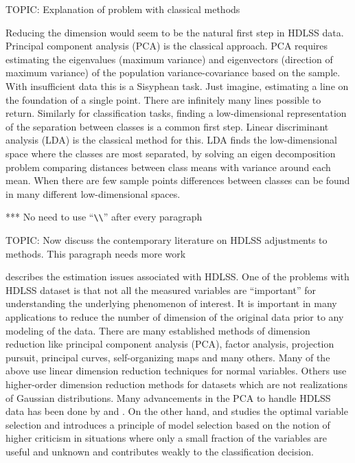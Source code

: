 \documentclass[12]{article}
\newcommand{\blue}{\color{blue}}
\begin{document}
{\blue TOPIC: Explanation of problem with classical methods}

Reducing the dimension would seem to be the natural first step in HDLSS data. Principal component analysis (PCA) is the classical approach. PCA requires estimating the eigenvalues (maximum variance) and eigenvectors (direction of maximum variance) of the population variance-covariance based on the sample. With insufficient data this is a Sisyphean task. Just imagine, estimating a line on the foundation of a single point. There are infinitely many lines possible to return. Similarly for classification tasks, finding a low-dimensional representation of the separation between classes is a common first step. Linear discriminant analysis (LDA) is the classical method for this. LDA finds the low-dimensional space where the classes are most separated, by solving an eigen decomposition problem comparing distances between class means with variance around each mean. When there are few sample points differences between classes can be found in many different low-dimensional spaces. 

{\blue*** No need to use ``\verb#\\#'' after every paragraph}


{\blue TOPIC: Now discuss the contemporary literature on HDLSS adjustments to methods. This paragraph needs more work}

\cite{marron:2007} describes the estimation issues associated with HDLSS.  
One of the problems with HDLSS dataset is that not all the measured variables are ``important'' for understanding the underlying phenomenon of interest. It is important in many applications to reduce the number of dimension of the original data prior to any modeling of the data. There are many established methods of dimension reduction like principal component analysis (PCA), factor analysis, projection pursuit, principal curves, self-organizing maps and many others. Many of the above use linear dimension reduction techniques for normal variables. Others use higher-order dimension reduction methods for datasets which are not realizations of Gaussian distributions.  Many advancements in the PCA to handle HDLSS data has been done by \cite{marron:2011} and \cite{yata:2010}. On the other hand, \cite{donoho:2009} and \cite{donoho:2008} studies the optimal variable selection and introduces a principle of model selection based on the notion of higher criticism in situations where only a small fraction of the variables are useful and unknown and contributes weakly to the classification decision.\\
\end{document}
